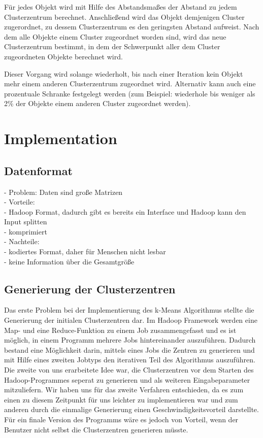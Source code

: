\documentclass[a4paper]{llncs}
\begin{document}
Für jedes Objekt wird mit Hilfe des Abstandsmaßes der Abstand zu jedem Clusterzentrum berechnet. Anschließend wird das Objekt demjenigen Cluster zugerordnet, zu dessem Clusterzentrum es den geringsten Abstand aufweist. Nach dem alle Objekte einem Cluster zugeordnet worden sind, wird das neue Clusterzentrum bestimmt, in dem der Schwerpunkt aller dem Cluster zugeordneten Objekte berechnet wird.

Dieser Vorgang wird solange wiederholt, bis nach einer Iteration kein Objekt mehr einem anderen Clusterzentrum zugeordnet wird. Alternativ kann auch eine prozentuale Schranke festgelegt werden (zum Beispiel: wiederhole bis weniger als 2\% der Objekte einem anderen Cluster zugeordnet werden).

\section{Implementation}

\subsection{Datenformat}
- Problem: Daten sind große Matrizen\\
- Vorteile:\\
    - Hadoop Format, dadurch gibt es bereits ein Interface und Hadoop kann den Input splitten\\
    - komprimiert\\
- Nachteile:\\
    - kodiertes Format, daher für Menschen nicht lesbar\\
    - keine Information über die Gesamtgröße

\subsection{Generierung der Clusterzentren}
Das erste Problem bei der Implementierung des k-Means Algorithmus stellte die Generierung der initialen Clusterzentren dar. Im Hadoop Framework werden eine Map- und eine Reduce-Funktion zu einem Job zusammengefasst und es ist möglich, in einem Programm mehrere Jobs hintereinander auszuführen. Dadurch bestand eine Möglichkeit darin, mittels eines Jobs die Zentren zu generieren und mit Hilfe eines zweiten Jobtyps den iterativen Teil des Algorithmus auszuführen. Die zweite von uns erarbeitete Idee war, die Clusterzentren vor dem Starten des Hadoop-Programmes seperat zu generieren und als weiteren Eingabeparameter mitzuliefern. Wir haben uns für das zweite Verfahren entschieden, da es zum einen zu diesem Zeitpunkt für uns leichter zu implementieren war und zum anderen durch die einmalige Generierung einen Geschwindigkeitsvorteil darstellte. Für ein finale Version des Programms wäre es jedoch von Vorteil, wenn der Benutzer nicht selbst die Clusterzentren generieren müsste.
\end{document}
